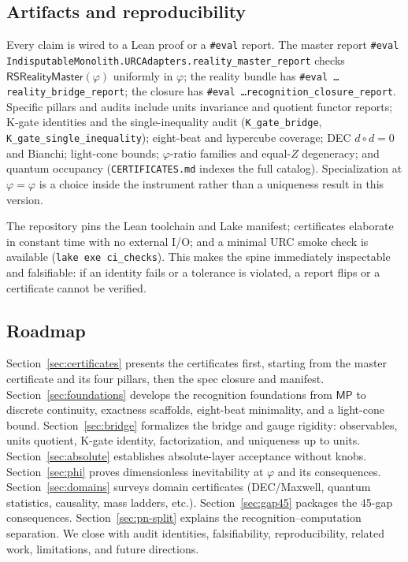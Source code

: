 \documentclass[11pt,a4paper,twoside]{article}
\numberwithin{equation}{section}
\newcommand{\phigr}{\varphi} %
\renewcommand{\phi}{\varphi}
\theoremstyle{customthm}
\theoremstyle{customdef}
\theoremstyle{customrem}
\begin{document}
\subsection{Artifacts and reproducibility}

Every claim is wired to a Lean proof or a \texttt{\#eval} report. The master report \texttt{\#eval IndisputableMonolith.URCAdapters.reality\_master\_report} checks \(\mathsf{RSRealityMaster}(\phi)\) uniformly in $\phi$; the reality bundle has \texttt{\#eval \dots reality\_bridge\_report}; the closure has \texttt{\#eval \dots recognition\_closure\_report}. Specific pillars and audits include units invariance and quotient functor reports; K-gate identities and the single-inequality audit (\texttt{K\_gate\_bridge}, \texttt{K\_gate\_single\_inequality}); eight-beat and hypercube coverage; DEC \(d\circ d=0\) and Bianchi; light-cone bounds; $\varphi$-ratio families and equal-\(Z\) degeneracy; and quantum occupancy (\texttt{CERTIFICATES.md} indexes the full catalog). Specialization at $\varphi=\phigr$ is a choice inside the instrument rather than a uniqueness result in this version.

The repository pins the Lean toolchain and Lake manifest; certificates elaborate in constant time with no external I/O; and a minimal URC smoke check is available (\texttt{lake exe ci\_checks}). This makes the spine immediately inspectable and falsifiable: if an identity fails or a tolerance is violated, a report flips or a certificate cannot be verified.

\subsection{Roadmap}

Section~\ref{sec:certificates} presents the certificates first, starting from the master certificate and its four pillars, then the spec closure and manifest. Section~\ref{sec:foundations} develops the recognition foundations from \(\mathsf{MP}\) to discrete continuity, exactness scaffolds, eight-beat minimality, and a light-cone bound. Section~\ref{sec:bridge} formalizes the bridge and gauge rigidity: observables, units quotient, K-gate identity, factorization, and uniqueness up to units. Section~\ref{sec:absolute} establishes absolute-layer acceptance without knobs. Section~\ref{sec:phi} proves dimensionless inevitability at \(\phi\) and its consequences. Section~\ref{sec:domains} surveys domain certificates (DEC/Maxwell, quantum statistics, causality, mass ladders, etc.). Section~\ref{sec:gap45} packages the 45-gap consequences. Section~\ref{sec:pn-split} explains the recognition–computation separation. We close with audit identities, falsifiability, reproducibility, related work, limitations, and future directions.
\end{document}
